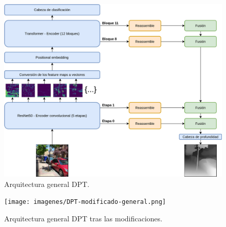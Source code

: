 \begin{figure}[H]
\centering
\includegraphics[width=\textwidth]{imagenes/DPT-general.png}
\caption{Arquitectura general DPT.}
\label{fig:dpt-general}
\end{figure}

\begin{figure}[H]
\centering
\texttt{[image: imagenes/DPT-modificado-general.png]}
\caption{Arquitectura general DPT tras las modificaciones.}
\label{fig:dpt-mod-general}
\end{figure}

